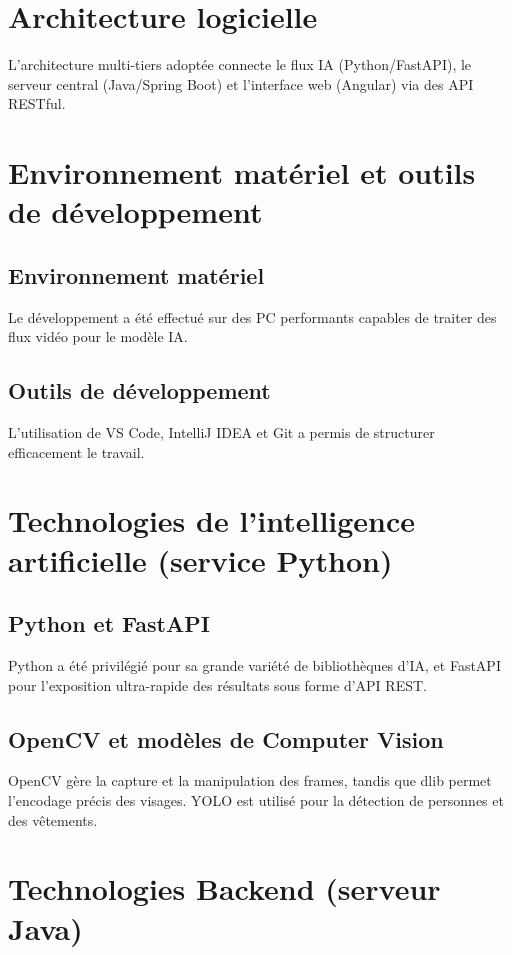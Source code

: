 \documentclass[12pt,a4paper]{report}
\begin{document}
\section{Architecture logicielle}
L'architecture multi-tiers adoptée connecte le flux IA (Python/FastAPI), le serveur central
(Java/Spring Boot) et l'interface web (Angular) via des API RESTful.

\section{Environnement matériel et outils de développement}

\subsection{Environnement matériel}
Le développement a été effectué sur des PC performants capables de traiter des flux vidéo pour le modèle IA.

\subsection{Outils de développement}
L'utilisation de VS Code, IntelliJ IDEA et Git a permis de structurer efficacement le travail.

\section{Technologies de l'intelligence artificielle (service Python)}

\subsection{Python et FastAPI}
Python a été privilégié pour sa grande variété de bibliothèques d'IA, et FastAPI pour l'exposition ultra-rapide des résultats sous forme d'API REST.

\subsection{OpenCV et modèles de Computer Vision}
OpenCV gère la capture et la manipulation des frames, tandis que dlib permet l'encodage précis des visages. YOLO est utilisé pour la détection de personnes et des vêtements.

\section{Technologies Backend (serveur Java)}
\end{document}
